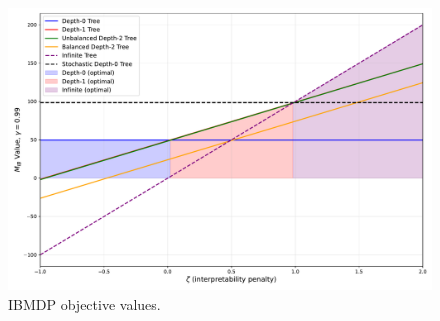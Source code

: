 \begin{figure}
    \centering
    \includegraphics[width=1\textwidth]{images/images_part1/objective_values_plot.pdf}
    \caption{IBMDP objective values.}\label{fig:objectives}
\end{figure}
